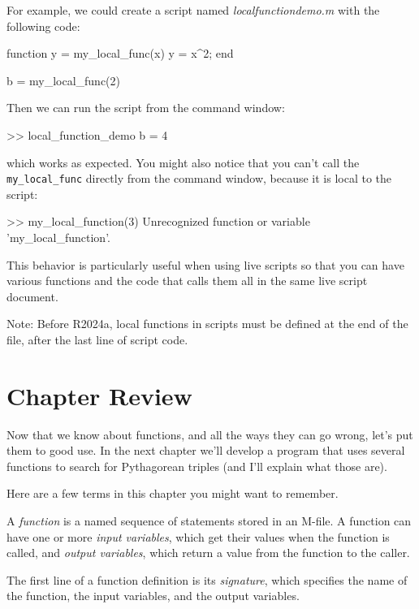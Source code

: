 \documentclass[../../book.tex]{subfiles}
\begin{document}
For example, we could create a script named \emph{local\textunderscore function\textunderscore demo.m}
with the following code:

\begin{code}
    function y = my_local_func(x)
    y = x^2;
    end
    
    b = my_local_func(2)    
\end{code}

Then we can run the script from the command window:
\begin{code}
    >> local_function_demo
    b =
         4
\end{code}
which works as expected.  You might also notice that you can't call the \lstinline{my_local_func} directly from the command window, because it is local to the script:
\begin{code}
    >> my_local_function(3)
    Unrecognized function or variable 'my_local_function'. 
\end{code}

This behavior is particularly useful when using live scripts so that you can have various functions and the code that calls them all in the same live script document.

Note: Before R2024a, local functions in scripts must be defined at the end of the file, after the last line of script code.

\section{Chapter Review}

Now that we know about functions, and all the ways they can go wrong, let's put them to good use.  In the next chapter we'll develop a program that uses several functions to search for Pythagorean triples (and I'll explain what those are).

Here are a few terms in this chapter you might want to remember.

A \emph{function} is a named sequence of statements stored in an M-file.
A function can have one or more \emph{input variables}, which get their values when the function is called, and \emph{output variables}, which return a value from the function to the caller.

The first line of a function definition is its \emph{signature}, which
specifies the name of the function, the input variables, and the
output variables.
\end{document}
